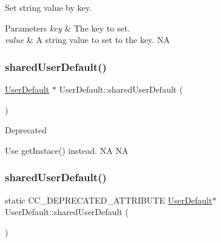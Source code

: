 Set string value by key. 
\begin{DoxyParams}{Parameters}
{\em key} & The key to set. \\
\hline
{\em value} & A string value to set to the key.  NA \\
\hline
\end{DoxyParams}
\mbox{\label{classUserDefault_ad47d1595d50f32eb7805fd36dd844b38}} 
\subsubsection{\texorpdfstring{shared\+User\+Default()}{sharedUserDefault()}\hspace{0.1cm}{\footnotesize\ttfamily [1/2]}}
{\footnotesize\ttfamily \hyperlink{classUserDefault}{User\+Default} $\ast$ User\+Default\+::shared\+User\+Default (\begin{DoxyParamCaption}{ }\end{DoxyParamCaption})\hspace{0.3cm}{\ttfamily [static]}}

\begin{DoxyRefDesc}{Deprecated}
\item[\hyperlink{deprecated__deprecated000060}{Deprecated}]Use get\+Instace() instead.  NA  NA \end{DoxyRefDesc}
\mbox{\label{classUserDefault_aaf51e16825fadb43004c92aba61a55e1}} 
\subsubsection{\texorpdfstring{shared\+User\+Default()}{sharedUserDefault()}\hspace{0.1cm}{\footnotesize\ttfamily [2/2]}}
{\footnotesize\ttfamily static C\+C\+\_\+\+D\+E\+P\+R\+E\+C\+A\+T\+E\+D\+\_\+\+A\+T\+T\+R\+I\+B\+U\+TE \hyperlink{classUserDefault}{User\+Default}$\ast$ User\+Default\+::shared\+User\+Default (\begin{DoxyParamCaption}{ }\end{DoxyParamCaption})\hspace{0.3cm}{\ttfamily [static]}}

